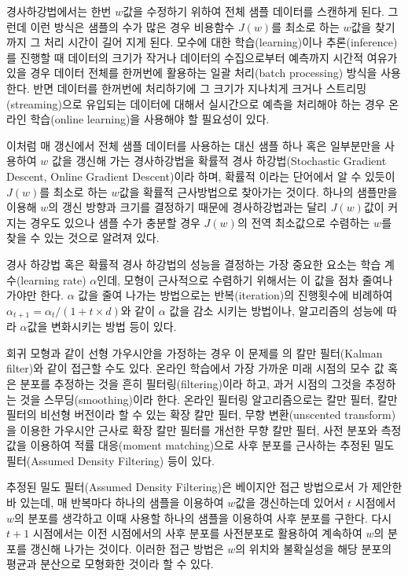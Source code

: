 \documentclass[oneside,b5paper,11pt]{book} %
\begin{document}
 경사하강법에서는 한번 $w$값을 수정하기 위하여 전체 샘플 데이터를 스캔하게 된다. 그런데 이런 방식은 샘플의 수가 많은 경우 
비용함수 $J(w)$를 최소로 하는 $w$값을 찾기 까지 그 처리 시간이 길어 지게 된다. 모수에 대한 학습(learning)이나 추론(inference)를 진행할 때 데이터의 크기가 작거나 데이터의 수집으로부터 예측까지 시간적 여유가 있을 경우 데이터 전체를 한꺼번에 활용하는 일괄 처리(batch processing) 방식을 사용한다. 반면 데이터를 한꺼번에 처리하기에 그 크기가 지나치게 크거나 스트리밍(streaming)으로 유입되는 데이터에 대해서 실시간으로 예측을 처리해야 하는 경우 온라인 학습(online learning)을 사용해야 할 필요성이 있다.

 이처럼 매 갱신에서 전체 샘플 데이터를 사용하는 대신 샘플 하나 혹은 일부분만을 사용하여 $w$ 값을 갱신해 가는 경사하강법을 확률적 경사 하강법(Stochastic Gradient Descent, Online Gradient Descent)이라 하며, 확률적 이라는 단어에서 알 수 있듯이 $J(w)$를 최소로 하는 $w$값을 확률적 근사방법으로 찾아가는 것이다. 하나의 샘플만을 이용해 $w$의 갱신 방향과 크기를 결정하기 때문에 경사하강법과는 달리 $J(w)$값이 커지는 경우도 있으나 샘플 수가 충분할 경우 $J(w)$의 전역 최소값으로 수렴하는 $w$를 찾을 수 있는 것으로 알려져 있다. \citep{Bottou2010}

 경사 하강법 혹은 확률적 경사 하강법의 성능을 결정하는 가장 중요한 요소는 학습 계수(learning rate) $\alpha$인데, 모형이 근사적으로 수렴하기 위해서는 이 값을 점차 줄여나가야만 한다. $\alpha$ 값을 줄여 나가는 방법으로는 반복(iteration)의 진행횟수에 비례하여 $\alpha_{t+1} = \alpha_{t} / (1 + t \times d )$와 같이 $\alpha$ 값을 감소 시키는 방법이나, 알고리즘의 성능에 따라 $\alpha$값을 변화시키는 방법 등이 있다. 

 회귀 모형과 같이 선형 가우시안을 가정하는 경우 이 문제를 \citet{Kalman1960}의 칼만 필터(Kalman filter)와 같이 접근할 수도 있다. 온라인 학습에서 가장 가까운 미래 시점의 모수 값 혹은 분포를 추정하는 것을 흔히 필터링(filtering)이라 하고, 과거 시점의 그것을 추정하는 것을 스무딩(smoothing)이라 한다. 온라인 필터링 알고리즘으로는 칼만 필터\citep{Kalman1960}, 칼만 필터의 비선형 버전이라 할 수 있는 확장 칼만 필터\citep{Smith1962}, 무향 변환(unscented transform)을 이용한 가우시안 근사로 확장 칼만 필터를 개선한 무향 칼만 필터\citep{Julier1997}, 사전 분포와 측정값을 이용하여 적률 대응(moment matching)으로 사후 분포를 근사하는 추정된 밀도 필터(Assumed Density Filtering)\citep{Opper1996} 등이 있다.
 
 추정된 밀도 필터(Assumed Density Filtering)은 베이지안 접근 방법으로서 \citet{Opper1996}가 제안한바 있는데, 매 반복마다 하나의 샘플을 이용하여 $w$값을 갱신하는데 있어서 $t$ 시점에서 $w$의 분포를 생각하고 이때 사용할 하나의 샘플을 이용하여 사후 분포를 구한다. 다시 $t+1$ 시점에서는 이전 시점에서의 사후 분포를 사전분포로 활용하여 계속하여 $w$의 분포를 갱신해 나가는 것이다. 이러한 접근 방법은 $w$의 위치와 불확실성을 해당 분포의 평균과 분산으로 모형화한 것이라 할 수 있다. 
\end{document}
